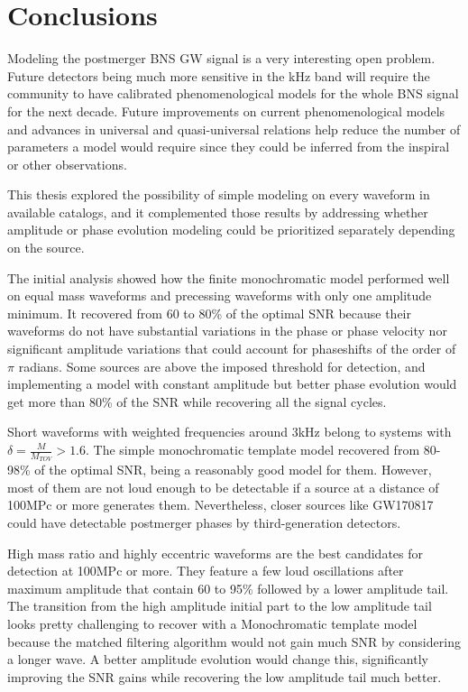 \newpage
{}

\chapter*{Conclusions}

Modeling the postmerger BNS GW signal is a very interesting open problem. Future detectors being much more sensitive in the kHz band will require the community to have calibrated phenomenological models for the whole BNS signal for the next decade. Future improvements on current phenomenological models and advances in universal and quasi-universal relations help reduce the number of parameters a model would require since they could be inferred from the inspiral or other observations.

This thesis explored the possibility of simple modeling on every waveform in available catalogs, and it complemented those results by addressing whether amplitude or phase evolution modeling could be prioritized separately depending on the source. 
 
The initial analysis showed how the finite monochromatic model performed well on equal mass waveforms and precessing waveforms with only one amplitude minimum. It recovered from 60 to 80\% of the optimal SNR because their waveforms do not have substantial variations in the phase or phase velocity nor significant amplitude variations that could account for phaseshifts of the order of $\pi$ radians. Some sources are above the imposed threshold for detection, and implementing a model with constant amplitude but better phase evolution would get more than 80\% of the SNR while recovering all the signal cycles.

Short waveforms with weighted frequencies around 3kHz belong to systems with $\delta=\frac{M}{M_{TOV}} > 1.6$. The simple monochromatic template model recovered from 80-98\% of the optimal SNR, being a reasonably good model for them. However, most of them are not loud enough to be detectable if a source at a distance of 100MPc or more generates them. Nevertheless, closer sources like GW170817 could have detectable postmerger phases by third-generation detectors.

High mass ratio and highly eccentric waveforms are the best candidates for detection at 100MPc or more. They feature a few loud oscillations after maximum amplitude that contain 60 to 95\% followed by a lower amplitude tail. The transition from the high amplitude initial part to the low amplitude tail looks pretty challenging to recover with a Monochromatic template model because the matched filtering algorithm would not gain much SNR by considering a longer wave. A better amplitude evolution would change this, significantly improving the SNR gains while recovering the low amplitude tail much better.


